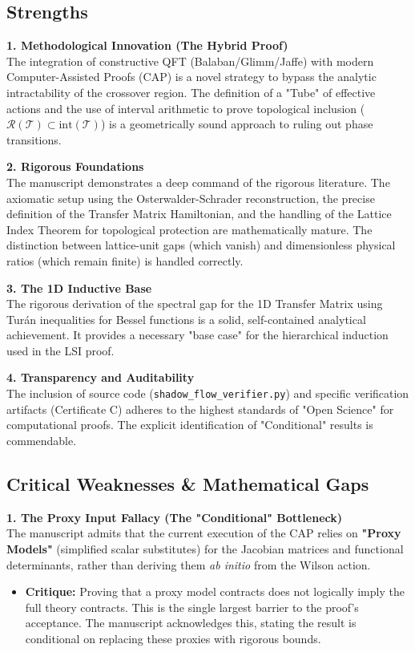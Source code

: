\subsection*{Strengths}

\textbf{1. Methodological Innovation (The Hybrid Proof)} \\
The integration of constructive QFT (Balaban/Glimm/Jaffe) with modern Computer-Assisted Proofs (CAP) is a novel strategy to bypass the analytic intractability of the crossover region. The definition of a "Tube" of effective actions and the use of interval arithmetic to prove topological inclusion ($\mathcal{R}(\mathcal{T}) \subset \text{int}(\mathcal{T})$) is a geometrically sound approach to ruling out phase transitions.

\textbf{2. Rigorous Foundations} \\
The manuscript demonstrates a deep command of the rigorous literature. The axiomatic setup using the Osterwalder-Schrader reconstruction, the precise definition of the Transfer Matrix Hamiltonian, and the handling of the Lattice Index Theorem for topological protection are mathematically mature. The distinction between lattice-unit gaps (which vanish) and dimensionless physical ratios (which remain finite) is handled correctly.

\textbf{3. The 1D Inductive Base} \\
The rigorous derivation of the spectral gap for the 1D Transfer Matrix using Turán inequalities for Bessel functions is a solid, self-contained analytical achievement. It provides a necessary "base case" for the hierarchical induction used in the LSI proof.

\textbf{4. Transparency and Auditability} \\
The inclusion of source code (\texttt{shadow\_flow\_verifier.py}) and specific verification artifacts (Certificate C) adheres to the highest standards of "Open Science" for computational proofs. The explicit identification of "Conditional" results is commendable.

\subsection*{Critical Weaknesses \& Mathematical Gaps}

\textbf{1. The Proxy Input Fallacy (The "Conditional" Bottleneck)} \\
The manuscript admits that the current execution of the CAP relies on \textbf{"Proxy Models"} (simplified scalar substitutes) for the Jacobian matrices and functional determinants, rather than deriving them \textit{ab initio} from the Wilson action.
\begin{itemize}
    \item \textbf{Critique:} Proving that a proxy model contracts does not logically imply the full  theory contracts. This is the single largest barrier to the proof's acceptance. The manuscript acknowledges this, stating the result is conditional on replacing these proxies with rigorous bounds.
\end{itemize}

